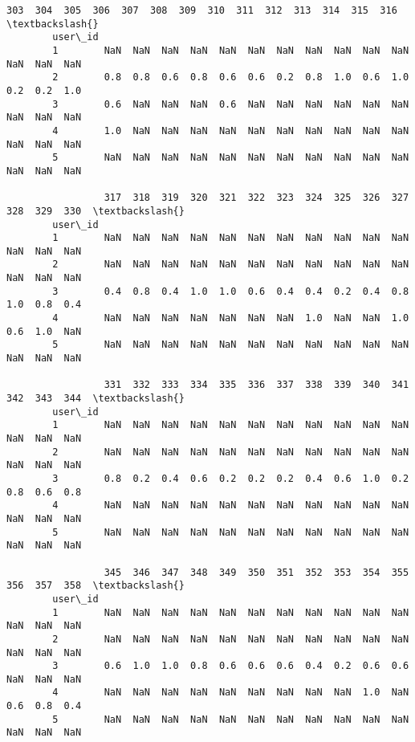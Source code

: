 \documentclass[11pt]{article}
\begin{document}
\begin{Verbatim}[commandchars=\\\{\}]
                 303  304  305  306  307  308  309  310  311  312  313  314  315  316  \textbackslash{}
        user\_id                                                                         
        1        NaN  NaN  NaN  NaN  NaN  NaN  NaN  NaN  NaN  NaN  NaN  NaN  NaN  NaN   
        2        0.8  0.8  0.6  0.8  0.6  0.6  0.2  0.8  1.0  0.6  1.0  0.2  0.2  1.0   
        3        0.6  NaN  NaN  NaN  0.6  NaN  NaN  NaN  NaN  NaN  NaN  NaN  NaN  NaN   
        4        1.0  NaN  NaN  NaN  NaN  NaN  NaN  NaN  NaN  NaN  NaN  NaN  NaN  NaN   
        5        NaN  NaN  NaN  NaN  NaN  NaN  NaN  NaN  NaN  NaN  NaN  NaN  NaN  NaN   
        
                 317  318  319  320  321  322  323  324  325  326  327  328  329  330  \textbackslash{}
        user\_id                                                                         
        1        NaN  NaN  NaN  NaN  NaN  NaN  NaN  NaN  NaN  NaN  NaN  NaN  NaN  NaN   
        2        NaN  NaN  NaN  NaN  NaN  NaN  NaN  NaN  NaN  NaN  NaN  NaN  NaN  NaN   
        3        0.4  0.8  0.4  1.0  1.0  0.6  0.4  0.4  0.2  0.4  0.8  1.0  0.8  0.4   
        4        NaN  NaN  NaN  NaN  NaN  NaN  NaN  1.0  NaN  NaN  1.0  0.6  1.0  NaN   
        5        NaN  NaN  NaN  NaN  NaN  NaN  NaN  NaN  NaN  NaN  NaN  NaN  NaN  NaN   
        
                 331  332  333  334  335  336  337  338  339  340  341  342  343  344  \textbackslash{}
        user\_id                                                                         
        1        NaN  NaN  NaN  NaN  NaN  NaN  NaN  NaN  NaN  NaN  NaN  NaN  NaN  NaN   
        2        NaN  NaN  NaN  NaN  NaN  NaN  NaN  NaN  NaN  NaN  NaN  NaN  NaN  NaN   
        3        0.8  0.2  0.4  0.6  0.2  0.2  0.2  0.4  0.6  1.0  0.2  0.8  0.6  0.8   
        4        NaN  NaN  NaN  NaN  NaN  NaN  NaN  NaN  NaN  NaN  NaN  NaN  NaN  NaN   
        5        NaN  NaN  NaN  NaN  NaN  NaN  NaN  NaN  NaN  NaN  NaN  NaN  NaN  NaN   
        
                 345  346  347  348  349  350  351  352  353  354  355  356  357  358  \textbackslash{}
        user\_id                                                                         
        1        NaN  NaN  NaN  NaN  NaN  NaN  NaN  NaN  NaN  NaN  NaN  NaN  NaN  NaN   
        2        NaN  NaN  NaN  NaN  NaN  NaN  NaN  NaN  NaN  NaN  NaN  NaN  NaN  NaN   
        3        0.6  1.0  1.0  0.8  0.6  0.6  0.6  0.4  0.2  0.6  0.6  NaN  NaN  NaN   
        4        NaN  NaN  NaN  NaN  NaN  NaN  NaN  NaN  NaN  1.0  NaN  0.6  0.8  0.4   
        5        NaN  NaN  NaN  NaN  NaN  NaN  NaN  NaN  NaN  NaN  NaN  NaN  NaN  NaN   
        

\end{Verbatim}
\end{document}
